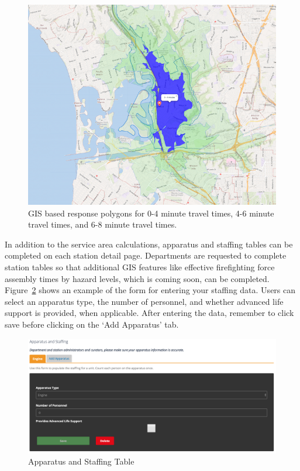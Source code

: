 \documentclass[12pt,oneside]{book}
\begin{document}
\begin{figure}[ht!]
\centering
\includegraphics[width=.9\columnwidth]{Figures/response_area}
\caption{GIS based response polygons for 0-4 minute travel times, 4-6 minute travel times, and 6-8 minute travel times.}
\label{fig:response_area}
\end{figure}

In addition to the service area calculations, apparatus and staffing tables can be completed on each station detail page. Departments are requested to complete station tables so that additional GIS features like effective firefighting force assembly times by hazard levels, which is coming soon, can be completed. Figure~\ref{fig:staffing} shows an example of the form for entering your staffing data. Users can select an apparatus type, the number of personnel, and whether advanced life support is provided, when applicable. After entering the data, remember to click save before clicking on the `Add Apparatus' tab.

\begin{figure}[ht!]
\centering
\includegraphics[width=.9\columnwidth]{Figures/staffing}
\caption{Apparatus and Staffing Table}
\label{fig:staffing}
\end{figure}
\end{document}
